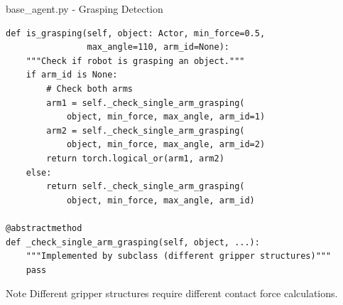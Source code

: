 \begin{frame}[fragile]{base\_agent.py - Grasping Detection}
\begin{lstlisting}
def is_grasping(self, object: Actor, min_force=0.5,
                max_angle=110, arm_id=None):
    """Check if robot is grasping an object."""
    if arm_id is None:
        # Check both arms
        arm1 = self._check_single_arm_grasping(
            object, min_force, max_angle, arm_id=1)
        arm2 = self._check_single_arm_grasping(
            object, min_force, max_angle, arm_id=2)
        return torch.logical_or(arm1, arm2)
    else:
        return self._check_single_arm_grasping(
            object, min_force, max_angle, arm_id)

@abstractmethod
def _check_single_arm_grasping(self, object, ...):
    """Implemented by subclass (different gripper structures)"""
    pass
\end{lstlisting}

\begin{block}{Note}
Different gripper structures require different contact force calculations.
\end{block}
\end{frame}

